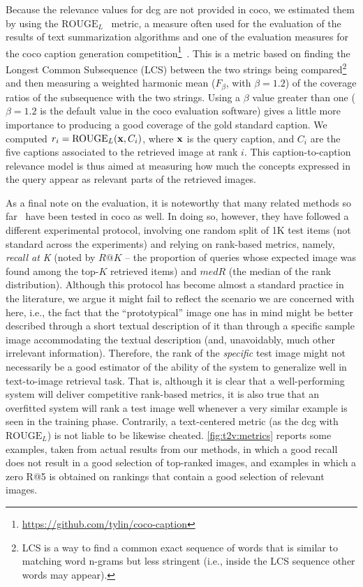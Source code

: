 Because the relevance values for \gls{dcg} are not provided in \gls{coco}, we estimated them by using the $\text{ROUGE}_L$~\cite{lin2004rouge} metric, a measure often used for the evaluation of the results of text summarization algorithms and one of the evaluation measures for the \gls{coco} caption generation competition\footnote{\url{https://github.com/tylin/coco-caption}}~\cite{chen2015microsoft}.
This is a metric based on finding the Longest Common Subsequence (LCS) between the two strings being compared\footnote{LCS is a way to find a common exact sequence of words that is similar to matching word n-grams but less stringent (i.e.,  inside the LCS sequence other words may appear).} and then measuring a weighted harmonic mean ($F_\beta$, with $\beta=1.2$) of the coverage ratios of the subsequence with the two strings.
Using a $\beta$ value greater than one ($\beta=1.2$ is the default value in the \gls{coco} evaluation software) gives a little more importance to producing a good coverage of the gold standard caption.
We computed $r_i = \text{ROUGE}_L ( \mathbf{x}, C_i ) $, where $\mathbf{x}$ is the query caption, and $C_i$ are the five captions associated to the retrieved image at rank $i$.
This caption-to-caption relevance model is thus aimed at measuring how much the concepts expressed in the query appear as relevant parts of the retrieved images.

As a final note on the evaluation, it is noteworthy that many related methods so far~\cite{mao2014deep,ma2015multimodal,klein2014fisher,karpathy2015deep,donahue2015long,kiros2015skip,wang2016learning} have been tested in \gls{coco} as well.
In doing so, however, they have followed a different experimental protocol, involving one random split of 1K test items (not standard across the experiments) and relying on rank-based metrics, namely, \emph{recall at K} (noted by $R@K$ -- the proportion of queries whose expected image was found among the top-$K$ retrieved items) and $medR$ (the median of the rank distribution).
Although this protocol has become almost a standard practice in the literature, we argue it might fail to reflect the scenario we are concerned with here, i.e.,  the fact that the ``prototypical'' image one has in mind might be better described through a short textual description of it than through a specific sample image accommodating the textual description (and, unavoidably, much other irrelevant information).
Therefore, the rank of the \emph{specific} test image might not necessarily be a good estimator of the ability of the system to generalize well in text-to-image retrieval task.
That is, although it is clear that a well-performing system will deliver competitive rank-based metrics, it is also true that an overfitted system will rank a test image well whenever a very similar example is seen in the training phase.
Contrarily, a text-centered metric (as the \gls{dcg} with $\text{ROUGE}_L$) is not liable to be likewise cheated.
\ref{fig:t2v:metrics} reports some examples, taken from actual results from our methods, in which a good recall does not result in a good selection of top-ranked images, and examples in which a zero R@5 is obtained on rankings that contain a good selection of relevant images.

